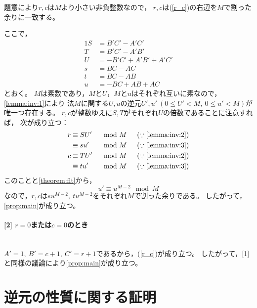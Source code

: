 \documentclass{article}
\makeatletter
\renewenvironment{proof}[1][\proofname]{\par
        \pushQED{\qed}
        \normalfont
        \topsep6\p@\@plus6\p@ \trivlist
        \item[\hskip\labelsep{\bfseries #1}\@addpunct{\bfseries}]\ignorespaces
    }{%
        \popQED\endtrivlist\@endpefalse
    }
\renewcommand{\proofname}{証明.}
\newcommand{\myparagraph}[1]{\paragraph{#1}\mbox{}\\}
\makeatother
\begin{document}
\begin{proof}
    題意により$r, c$は$M$より小さい非負整数なので，
    $r, c$は(\ref{r_c})の右辺を$M$で割った余りに一致する。

    ここで，
    \begin{alignat}{1}
        S &= B'C' - A'C' \\
        T &= B'C' - A'B' \\
        U &= -B'C' + A'B' + A'C' \\
        s &= BC - AC \\
        t &= BC - AB \\
        u &= -BC + AB + AC
    \end{alignat}
    とおく。
    $M$は素数であり，$M$と$U$，$M$と$u$はそれぞれ互いに素なので， %
    \cref{lemma:inv:1}により
    法$M$に関する$U, u$の逆元$U', u'\ (0 \leq U' < M,\ 0 \leq u' < M)$が唯一つ存在する。
    $r, c$が整数ゆえに$S, T$がそれぞれ$U$の倍数であることに注意すれば，
    次が成り立つ：
    \begin{alignat}{2}
        r &\equiv SU' & &\mod{M} \hspace{15pt} (\because \mbox{\cref{lemma:inv:2}}) \\
          &\equiv su' & &\mod{M} \hspace{15pt} (\because \mbox{\cref{lemma:inv:3}}) \\
        c &\equiv TU' & &\mod{M} \hspace{15pt} (\because \mbox{\cref{lemma:inv:2}}) \\
          &\equiv tu' & &\mod{M} \hspace{15pt} (\because \mbox{\cref{lemma:inv:3}})
    \end{alignat}
    このことと\cref{theorem:flt}から，
    \begin{equation}
        u' \equiv u^{M - 2} \mod{M}
    \end{equation}
    なので，$r, c$は$su^{M - 2},\ tu^{M - 2}$をそれぞれ$M$で割った余りである。
    したがって，\cref{prop:main}が成り立つ。

    \myparagraph{[2] $r = 0$または$c = 0$のとき}

    $A' = 1,\ B' = c + 1,\ C' = r + 1$であるから，(\ref{r_c})が成り立つ。
    したがって，[1]と同様の議論により\cref{prop:main}が成り立つ。
\end{proof}



\section{逆元の性質に関する証明}
\end{document}
